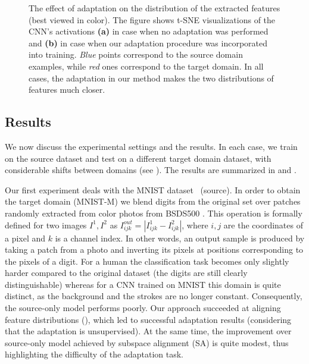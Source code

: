 \begin{figure}
\begin{minipage}{.5\textwidth}
  \hspace*{\fill}%
  \end{minipage}
  \caption{The effect of adaptation on the distribution of the extracted features (best viewed in color). The figure shows t-SNE \cite{Maaten13} visualizations of the CNN's activations {\bf (a)} in case when no adaptation was performed and {\bf (b)} in case when our adaptation procedure was incorporated into training. {\it Blue} points correspond to the source domain examples, while {\it red} ones correspond to the target domain. In all cases, the adaptation in our method makes the two distributions of features much closer.}
  \label{fig:exper_adapt_vis}
\end{figure}

\subsection{Results}
\label{sect:exper_quant}

We now discuss the experimental settings and the results. In each case, we train on the source dataset and test on a different target domain dataset, with considerable shifts between domains (see ). The results are summarized in  and . 

\vspace{2mm}
Our first experiment deals with the MNIST dataset~\cite{LeCun98} (source). In order to obtain the target domain ({\sc MNIST-M}) we blend digits from the original set over patches randomly extracted from color photos from BSDS500 \cite{Arbelaez11}. This operation is formally defined for two images $ I^{1}, I^{2} $ as $ I_{ijk}^{out} = | I_{ijk}^{1} - I_{ijk}^{2} | $, where $ i, j $ are the coordinates of a pixel and $ k $ is a channel index. In other words, an output sample is produced by taking a patch from a photo and inverting its pixels at positions corresponding to the pixels of a digit. For a human the classification task becomes only slightly harder compared to the original dataset (the digits are still clearly distinguishable) whereas for a CNN trained on MNIST this domain is quite distinct, as the background and the strokes are no longer constant. Consequently, the source-only model performs poorly. Our approach succeeded at aligning feature distributions (), which led to successful adaptation results (considering that the adaptation is unsupervised). At the same time, the improvement over source-only model achieved by subspace alignment (SA) \cite{Fernando13} is quite modest, thus highlighting the difficulty of the adaptation task. 

